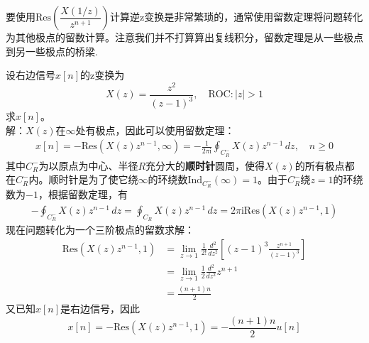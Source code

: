 要使用$\mathrm{Res}\left(\dfrac{X(1/z)}{z^{n+1}}\right)$计算逆z变换是非常繁琐的，通常使用留数定理将问题转化为其他极点的留数计算。注意我们并不打算算出复线积分，留数定理是从一些极点到另一些极点的桥梁.
\begin{example}
    设右边信号$x[n]$的z变换为
    \[X(z)=\frac{z^2}{(z-1)^3},\quad \mathrm{ROC}:|z|>1\]
    求$x[n]$。\\
    解：$X(z)$在$\infty$处有极点，因此可以使用留数定理：
    \begin{align*}
        x[n]=-\mathrm{Res}\left(X(z)z^{n-1},\infty\right)=-\frac{1}{2\pi \mathrm{i}}\oint_{C^-_R}X(z)z^{n-1}\,dz,\quad n\ge 0
    \end{align*}
    其中$C^-_R$为以原点为中心、半径$R$充分大的\textbf{顺时针}圆周，使得$X(z)$的所有极点都在$C^-_R$内。顺时针是为了使它绕$\infty$的环绕数$\mathrm{Ind}_{C^-_R}(\infty)=1$。由于$C^-_R$绕$z=1$的环绕数为$-1$，根据留数定理，有
    \begin{align*}
        -\oint_{C^-_R}X(z)z^{n-1}\,dz=\oint_{C_R}X(z)z^{n-1}\,dz=2\pi \mathrm{i} \mathrm{Res}\left(X(z)z^{n-1},1\right)
    \end{align*}
    现在问题转化为一个三阶极点的留数求解：
    \begin{align*}
        \mathrm{Res}\left(X(z)z^{n-1},1\right)&=\lim_{z\to 1}\frac{1}{2!}\frac{d^2}{dz^2}\left[(z-1)^3\frac{z^{n+1}}{(z-1)^3}\right]\\
        &=\lim_{z\to 1}\frac{1}{2}\frac{d^2}{dz^2}z^{n+1}\\
        &=\frac{(n+1)n}{2}
    \end{align*}
    又已知$x[n]$是右边信号，因此
    $$x[n]=-\mathrm{Res}\left(X(z)z^{n-1},1\right)=-\frac{(n+1)n}{2}u[n]$$    
\end{example}

